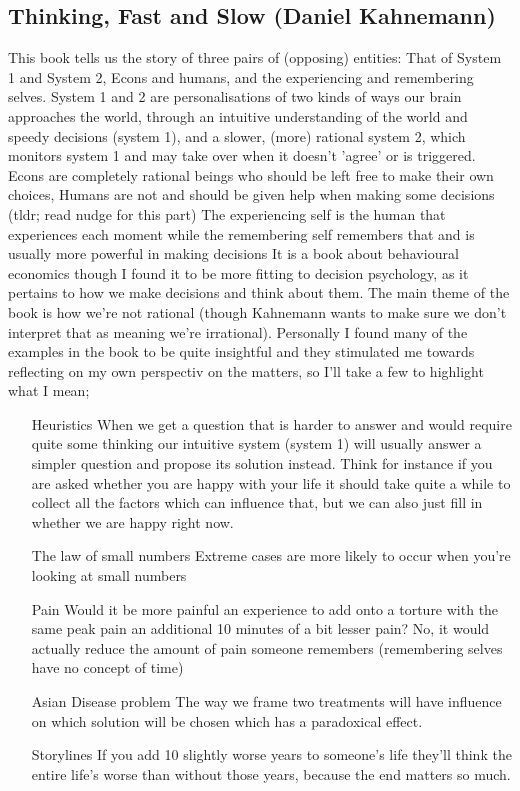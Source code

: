 \subsection{Thinking, Fast and Slow (Daniel Kahnemann)}

This book tells us the story of three pairs of (opposing) entities: That of System 1 and System 2, Econs and humans, and the experiencing and remembering selves.
System 1 and 2 are personalisations of two kinds of ways our brain approaches the world, through an intuitive understanding of the world and speedy decisions (system 1), and a slower, (more) rational system 2, which monitors system 1 and may take over when it doesn't 'agree' or is triggered. Econs are completely rational beings who should be left free to make their own choices, Humans are not and should be given help when making some decisions (tldr; read nudge for this part)
The experiencing self is the human that experiences each moment while the remembering self remembers that and is usually more powerful in making decisions
It is a book about behavioural economics though I found it to be more fitting to decision psychology, as it pertains to how we make decisions and think about them.
The main theme of the book is how we're not rational (though Kahnemann wants to make sure we don't interpret that as meaning we're irrational).
Personally I found many of the examples in the book to be quite insightful and they stimulated me towards reflecting on my own perspectiv on the matters, so I'll take a few to highlight what I mean;


\begin{itemize}[leftmargin=4cm]
\item[Heuristics] When we get a question that is harder to answer and would require quite some thinking our intuitive system (system 1) will usually answer a simpler question and propose its solution instead. Think for instance if you are asked whether you are happy with your life it should take quite a while to collect all the factors which can influence that, but we can also just fill in whether we are happy right now.
\item[The law of small numbers] Extreme cases are more likely to occur when you're looking at small numbers
\item[Pain] Would it be more painful an experience to add onto a torture with the same peak pain an additional 10 minutes of a bit lesser pain? No, it would actually reduce the amount of pain someone remembers (remembering selves have no concept of time)
\item[Asian Disease problem] The way we frame two treatments will have influence on which solution will be chosen which has a paradoxical effect.
\item[Storylines] If you add 10 slightly worse years to someone's life they'll think the entire life's worse than without those years, because the end matters so much.

\end{itemize}


